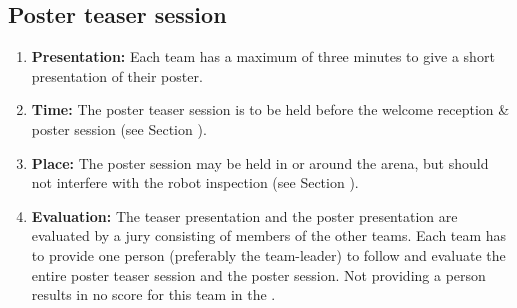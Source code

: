 \subsection{Poster teaser session}
\begin{enumerate}
	\item \textbf{Presentation:} Each team has a maximum of three minutes to give a short presentation of their poster.
	\item \textbf{Time:} The poster teaser session is to be held before the welcome reception \& poster session (see Section ).
	\item \textbf{Place:} The poster session may be held in or around the arena, but should not interfere with the robot inspection (see Section ).
	\item \textbf{Evaluation:} The teaser presentation and the poster presentation are evaluated by a jury consisting of members of the other teams. Each team has to provide one person (preferably the team-leader) to follow
	and evaluate
	the entire poster teaser session and the poster session. Not providing a person results in no score for this team in the .


\end{enumerate}
